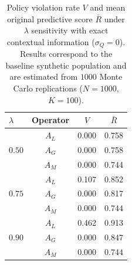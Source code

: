 \begin{table}[H]
\caption{Policy violation rate $V$ and mean original predictive score $\bar{R}$ under $\lambda$ sensitivity with exact contextual information ($\sigma_Q=0$). Results correspond to the baseline synthetic population and are estimated from $1000$ Monte Carlo replications ($N=1000$, $K=100$).}
\label{tab:lambda-robustness}
\centering
\small
\renewcommand{\arraystretch}{1.2}
\begin{tabular}{lccc}
\toprule
$\lambda$ & Operator & $V$ & $\bar{R}$ \\
\midrule
\multirow{3}{*}{$0.50$} & $A_L$ & 0.000 & 0.758 \\
 & $A_G$ & 0.000 & 0.758 \\
 & $A_M$ & 0.000 & 0.744 \\
\midrule
\multirow{3}{*}{$0.75$} & $A_L$ & 0.107 & 0.852 \\
 & $A_G$ & 0.000 & 0.817 \\
 & $A_M$ & 0.000 & 0.744 \\
\midrule
\multirow{3}{*}{$0.90$} & $A_L$ & 0.462 & 0.913 \\
 & $A_G$ & 0.000 & 0.847 \\
 & $A_M$ & 0.000 & 0.744 \\
\bottomrule
\end{tabular}
\end{table}
